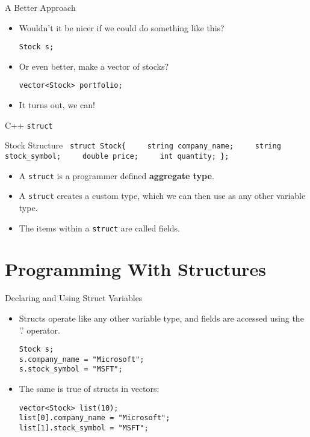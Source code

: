 \documentclass[]{beamer}
\begin{document}
\begin{frame}[fragile]{A Better Approach}
    \begin{itemize}
        \item Wouldn't it be nicer if we could do something like this?
        \begin{verbatim}
Stock s;
        \end{verbatim}
        \item Or even better, make a vector of stocks?
        \begin{verbatim}
vector<Stock> portfolio;
        \end{verbatim}
        \item It turns out, we can!
    \end{itemize}
\end{frame}

\begin{frame}[fragile]{C++ \texttt{struct}}

\begin{block}{Stock Structure}
{\tt
struct Stock\{
\newline\verb!    !string company\_name;
\newline\verb!    !string stock\_symbol;
\newline\verb!    !double price;
\newline\verb!    !int quantity;
\newline\};
}
\end{block}
\begin{itemize}[<+(2)->]
    \item A \texttt{struct} is a programmer defined \textbf{aggregate type}.
    \item A \texttt{struct} creates a custom type, which we can then use as any
        other variable type.
    \item The items within a \texttt{struct} are called fields.
\end{itemize}

\end{frame}

\section{Programming With Structures}

\begin{frame}[fragile]{Declaring and Using Struct Variables}
\begin{itemize}[<+->]
    \item Structs operate like any other variable type, and fields are
        accessed using the '.' operator.
        \begin{verbatim}
Stock s;
s.company_name = "Microsoft";
s.stock_symbol = "MSFT";
        \end{verbatim}
    \item The same is true of structs in vectors:
    \begin{verbatim}
vector<Stock> list(10);
list[0].company_name = "Microsoft";
list[1].stock_symbol = "MSFT";
    \end{verbatim}

\end{itemize}
\end{frame}
\end{document}
